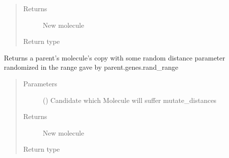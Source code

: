 \documentclass[letterpaper,10pt,english]{sphinxmanual}
\begin{document}
\begin{fulllineitems}
\begin{fulllineitems}
\begin{quote}
\begin{description}
\item[{Returns}] \leavevmode
\sphinxAtStartPar
New molecule

\item[{Return type}] \leavevmode
\sphinxAtStartPar
{\hyperref[\detokenize{molecular:molecular.Molecule}]{}}

\end{description}\end{quote}

\end{fulllineitems}


\begin{fulllineitems}
\label{\detokenize{MolOpt:MolOpt.MolOpt.mutate_distances}}
\sphinxAtStartPar
Returns a parent’s molecule’s copy with some random distance parameter randomized in the range gave by
parent.genes.rand\_range
\begin{quote}\begin{description}
\item[{Parameters}] \leavevmode
\sphinxAtStartPar
{} ({\hyperref[\detokenize{genetic:genetic.Chromosome}]{}}) \textendash{} Candidate which Molecule will suffer mutate\_distances

\item[{Returns}] \leavevmode
\sphinxAtStartPar
New molecule

\item[{Return type}] \leavevmode
\sphinxAtStartPar
{\hyperref[\detokenize{molecular:molecular.Molecule}]{}}

\end{description}\end{quote}

\end{fulllineitems}



\end{fulllineitems}
\end{document}
